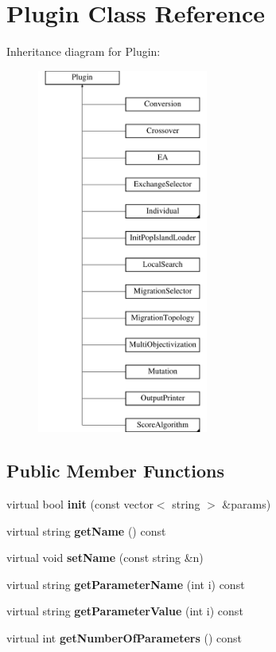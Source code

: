 \hypertarget{classPlugin}{}\section{Plugin Class Reference}
\label{classPlugin}
Inheritance diagram for Plugin\+:\begin{figure}[H]
\begin{center}
\leavevmode
\includegraphics[height=12.000000cm]{db/df9/classPlugin}
\end{center}
\end{figure}
\subsection*{Public Member Functions}
\begin{DoxyCompactItemize}
\item 
\mbox{\label{classPlugin_aef4aa350c3420324604b368702a48a4c}} 
virtual bool {\bfseries init} (const vector$<$ string $>$ \&params)
\item 
\mbox{\label{classPlugin_ac86ec12b0b9e91653fa52c8056cf4f52}} 
virtual string {\bfseries get\+Name} () const
\item 
\mbox{\label{classPlugin_a998ff760a6a53a08621ee01c051c5c0a}} 
virtual void {\bfseries set\+Name} (const string \&n)
\item 
\mbox{\label{classPlugin_aa52917db69bb89c02ce64fc5d2b16c5c}} 
virtual string {\bfseries get\+Parameter\+Name} (int i) const
\item 
\mbox{\label{classPlugin_a8ec9c87432a1e4040fdc013ad269db17}} 
virtual string {\bfseries get\+Parameter\+Value} (int i) const
\item 
\mbox{\label{classPlugin_a73cc5d43de734e4fa8bd320f52dd8528}} 
virtual int {\bfseries get\+Number\+Of\+Parameters} () const
\end{DoxyCompactItemize}
